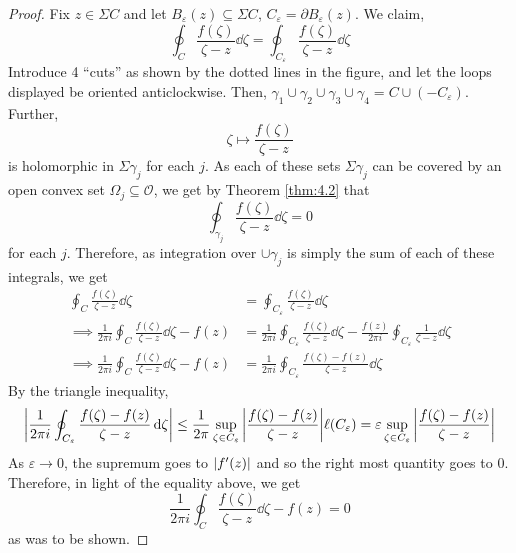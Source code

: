 \documentclass[../ComplexAnalysis_Notes.tex]{subfiles}
\begin{document}
\begin{proof}
  Fix \( z \in \Sigma C \) and let \( B_\varepsilon (z) \subseteq \Sigma C \), \( C_\varepsilon = \partial B_\varepsilon(z) \). We claim,
  \[
    \oint_C \frac{f(\zeta)}{\zeta-z} \dd{\zeta} = \oint_{C_\varepsilon} \frac{f(\zeta)}{\zeta-z} \dd{\zeta}
  \]
  Introduce 4 ``cuts'' as shown by the dotted lines in the figure, and let the loops displayed be oriented anticlockwise. Then, \( \gamma_1 \cup \gamma_2 \cup \gamma_3 \cup \gamma_4 = C  \cup (-C_\varepsilon) \). Further,
  \[
    \zeta \mapsto \frac{f(\zeta)}{\zeta-z}
  \]
  is holomorphic in \( \Sigma \gamma_j \) for each \( j \). As each of these sets \( \Sigma \gamma_j \) can be covered by an open convex set \( \Omega_j \subseteq \mathcal{O} \), we get by Theorem \ref{thm:4.2} that
  \[
    \oint_{\gamma_j} \frac{f(\zeta)}{\zeta-z} \dd{\zeta}= 0
  \]
  for each \( j \). Therefore, as integration over \( \cup \gamma_j \) is simply the sum of each of these integrals, we get
  \begin{align*}
    \oint_C \frac{f(\zeta)}{\zeta-z} \dd{\zeta}
     & = \oint_{C_\varepsilon} \frac{f(\zeta)}{\zeta-z} \dd{\zeta}                      \\
    \implies \frac{1}{2\pi i}\oint_C \frac{f(\zeta)}{\zeta-z} \dd{\zeta} -f(z)
     & = \frac{1}{2\pi i}\oint_{C_\varepsilon} \frac{f(\zeta)}{\zeta-z} \dd{\zeta}
    - \frac{f(z)}{2\pi i}\oint_{C_\varepsilon} \frac{1}{\zeta-z} \dd{\zeta}             \\
    \implies \frac{1}{2\pi i}\oint_C \frac{f(\zeta)}{\zeta-z} \dd{\zeta} -f(z)
     & = \frac{1}{2\pi i}\oint_{C_\varepsilon} \frac{f(\zeta)-f(z)}{\zeta-z} \dd{\zeta}
  \end{align*}
  By the triangle inequality,
  \[
    \abs{\frac{1}{2\pi i}\oint_{C_\varepsilon} \frac{f(\zeta)-f(z)}{\zeta-z} \dd{\zeta}} \leq \frac{1}{2\pi} \sup_{\zeta \in C_\varepsilon} \abs{\frac{f(\zeta)-f(z)}{\zeta-z}} \ell(C_\varepsilon) = \varepsilon \sup_{\zeta \in C_\varepsilon} \abs{\frac{f(\zeta)-f(z)}{\zeta-z}}
  \]
  As \( \varepsilon \to 0 \), the supremum goes to \( \abs{f'(z)} \) and so the right most quantity goes to 0. Therefore, in light of the equality above, we get
  \[
    \frac{1}{2\pi i}\oint_C \frac{f(\zeta)}{\zeta-z} \dd{\zeta} - f(z) = 0
  \]
  as was to be shown.
\end{proof}
\end{document}
